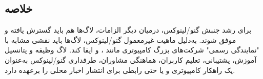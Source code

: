 \subsection{خلاصه}
برای رشد جنبش گنو/لینوکس، درمیان دیگر الزامات، لاگ‌ها هم باید گسترش یافته و موفق شوند.
به‌دلیل ماهیت غیرمعمول گنو/لینوکس، لاگ‌ها باید نقشی مشابه با "نمایندگی رسمی"
شرکت‌های بزرگ کامپیوتری مانند
،  و 
ایفا کند. لاگ وظیفه و پتانسیل آموزش، پشتیبانی، تعلیم کاربران، هماهنگی مشاوران،
طرفداری گنو/لینوکس به‌عنوان یک راهکار کامپیوتری و یا حتی رابطی برای انتشار اخبار محلی را برعهده دارد.


